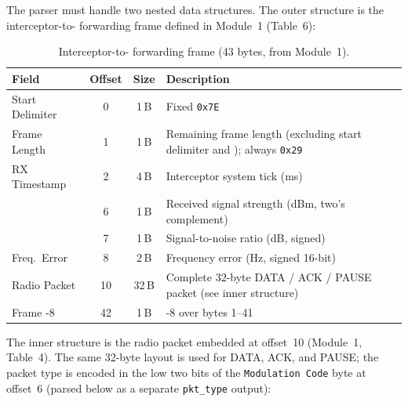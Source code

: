 \documentclass[11pt,letterpaper]{article}
\begin{document}
	The parser must handle two nested data structures. The outer structure is the interceptor-to-\FPGA{} forwarding frame defined in Module~1 (Table~6):

	\begin{table}[ht!]
		\centering
		\caption{Interceptor-to-\FPGA{} forwarding frame (43 bytes, from Module~1).}
		\label{tab:rxframe_recap}
		\renewcommand{\arraystretch}{1.3}
		\begin{tabularx}{\textwidth}{l c c X}
			\toprule
			\textbf{Field} & \textbf{Offset} & \textbf{Size} & \textbf{Description} \\
			\midrule
			Start Delimiter & 0 & 1\,B & Fixed \texttt{0x7E} \\
			Frame Length & 1 & 1\,B & Remaining frame length (excluding start delimiter and \CRC{}); always \texttt{0x29} \\
			RX Timestamp & 2 & 4\,B & Interceptor system tick (ms) \\
			\RSSI{} & 6 & 1\,B & Received signal strength (dBm, two's complement) \\
			\SNR{} & 7 & 1\,B & Signal-to-noise ratio (dB, signed) \\
			Freq.\ Error & 8 & 2\,B & Frequency error (Hz, signed 16-bit) \\
			Radio Packet & 10 & 32\,B & Complete 32-byte DATA / ACK / PAUSE packet (see inner structure) \\
			Frame \CRC{}-8 & 42 & 1\,B & \CRC{}-8 over bytes 1--41 \\
			\bottomrule
		\end{tabularx}
	\end{table}

	The inner structure is the radio packet embedded at offset~10 (Module~1, Table~4). The same 32-byte layout is used for DATA, ACK, and PAUSE; the packet type is encoded in the low two bits of the \texttt{Modulation Code} byte at offset~6 (parsed below as a separate \texttt{pkt\_type} output):
\end{document}
